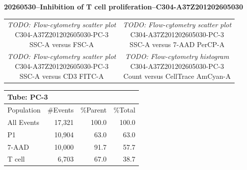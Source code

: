 \documentclass[UTF8,10pt,a4paper,fontset=fandol]{ctexart}
\begin{document}
\newpage

\begin{center}
\textbf{20260530--Inhibition of T cell proliferation--C304-A37Z201202605030}
\end{center}

\begin{center}
\begin{tabular}{cc}
\fbox{\parbox[c][3.0cm][c]{0.38\linewidth}{\centering
\textit{TODO: Flow-cytometry scatter plot}\\
C304-A37Z201202605030-PC-3\\
SSC-A versus FSC-A
}}
&
\fbox{\parbox[c][3.0cm][c]{0.38\linewidth}{\centering
\textit{TODO: Flow-cytometry scatter plot}\\
C304-A37Z201202605030-PC-3\\
SSC-A versus 7-AAD PerCP-A
}}
\\[0.5cm]
\fbox{\parbox[c][3.0cm][c]{0.38\linewidth}{\centering
\textit{TODO: Flow-cytometry scatter plot}\\
C304-A37Z201202605030-PC-3\\
SSC-A versus CD3 FITC-A
}}
&
\fbox{\parbox[c][3.0cm][c]{0.38\linewidth}{\centering
\textit{TODO: Flow-cytometry histogram}\\
C304-A37Z201202605030-PC-3\\
Count versus CellTrace AmCyan-A
}}
\end{tabular}
\end{center}

\begin{center}
\begin{tabular}{|l|r|r|r|}
\hline
\multicolumn{4}{|l|}{Tube: PC-3}\\
\hline
Population & \#Events & \%Parent & \%Total\\
\hline
All Events & 17,321 & 100.0 & 100.0\\
P1 & 10,904 & 63.0 & 63.0\\
7-AAD & 10,000 & 91.7 & 57.7\\
T cell & 6,703 & 67.0 & 38.7\\
\hline
\end{tabular}
\end{center}
\end{document}
